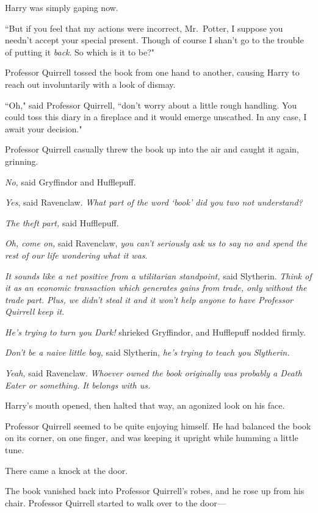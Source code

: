 Harry was simply gaping now.

``But if you feel that my actions were incorrect, Mr.~Potter, I suppose you needn't accept your special present. Though of course I shan't go to the trouble of putting it \emph{back}. So which is it to be?"

Professor Quirrell tossed the book from one hand to another, causing Harry to reach out involuntarily with a look of dismay.

``Oh," said Professor Quirrell, ``don't worry about a little rough handling. You could toss this diary in a fireplace and it would emerge unscathed. In any case, I await your decision."

Professor Quirrell casually threw the book up into the air and caught it again, grinning.

\emph{No,} said Gryffindor and Hufflepuff.

\emph{Yes}, said Ravenclaw. \emph{What part of the word `book' did you two not understand?}

\emph{The theft part,} said Hufflepuff.

\emph{Oh, come on,} said Ravenclaw, \emph{you can't seriously ask us to say no and spend the rest of our life wondering what it was}.

\emph{It sounds like a net positive from a utilitarian standpoint,} said Slytherin. \emph{Think of it as an economic transaction which generates gains from trade, only without the trade part. Plus, \emph{we} didn't steal it and it won't help anyone to have Professor Quirrell keep it.}

\emph{He's trying to turn you Dark!} shrieked Gryffindor, and Hufflepuff nodded firmly.

\emph{Don't be a naive little boy,} said Slytherin, \emph{he's trying to teach you Slytherin.}

\emph{Yeah,} said Ravenclaw. \emph{Whoever owned the book originally was probably a Death Eater or something. It belongs with us.}

Harry's mouth opened, then halted that way, an agonized look on his face.

Professor Quirrell seemed to be quite enjoying himself. He had balanced the book on its corner, on one finger, and was keeping it upright while humming a little tune.

There came a knock at the door.

The book vanished back into Professor Quirrell's robes, and he rose up from his chair. Professor Quirrell started to walk over to the door---

